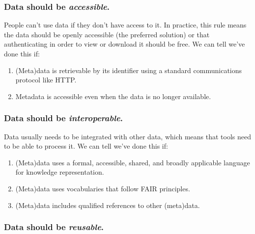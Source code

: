 \documentclass[
]{krantz}
\providecommand{\tightlist}{%
  \setlength{\itemsep}{0pt}\setlength{\parskip}{0pt}}
\begin{document}
\hypertarget{data-should-be-accessible.}{%
\subsubsection{\texorpdfstring{Data should be \emph{accessible}.}{Data should be accessible.}}\label{data-should-be-accessible.}}

People can't use data if they don't have access to it.
In practice,
this rule means the data should be openly accessible (the preferred solution)
or that authenticating in order to view or download it should be free.
We can tell we've done this if:

\begin{enumerate}
\def\labelenumi{\arabic{enumi}.}
\tightlist
\item
  (Meta)data is retrievable by its identifier
  using a standard communications protocol like HTTP.
\item
  Metadata is accessible even when the data is no longer available.
\end{enumerate}

\hypertarget{data-should-be-interoperable.}{%
\subsubsection{\texorpdfstring{Data should be \emph{interoperable}.}{Data should be interoperable.}}\label{data-should-be-interoperable.}}

Data usually needs to be integrated with other data,
which means that tools need to be able to process it.
We can tell we've done this if:

\begin{enumerate}
\def\labelenumi{\arabic{enumi}.}
\tightlist
\item
  (Meta)data uses a formal, accessible, shared, and broadly applicable language for knowledge representation.
\item
  (Meta)data uses vocabularies that follow FAIR principles.
\item
  (Meta)data includes qualified references to other (meta)data.
\end{enumerate}

\hypertarget{data-should-be-reusable.}{%
\subsubsection{\texorpdfstring{Data should be \emph{reusable}.}{Data should be reusable.}}\label{data-should-be-reusable.}}
\end{document}
